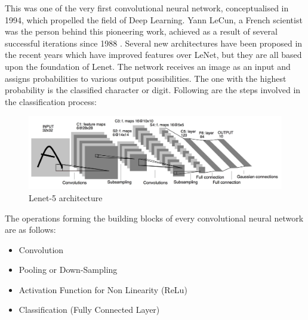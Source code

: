 This was one of the very first convolutional neural network, conceptualised in 1994, which propelled the field of Deep Learning. Yann LeCun, a French scientist was the person behind this pioneering work, achieved as a result of several successful iterations since 1988 \cite{cnn_culurciello}. Several new architectures have been proposed in the recent years which have improved features over LeNet, but they are all based upon the foundation of Lenet. \newline\newline
The network receives an image as an input and assigns probabilities to various output possibilities. The one with the highest probability is the classified character or digit. Following are the steps involved in the classification process:
\begin{figure}[h!]
\centering
\includegraphics[width=\linewidth]{figures/Lenet5.png}
\caption{Lenet-5 architecture}
\label{fig:cnn7}
\end{figure}

The operations forming the building blocks of every convolutional neural network are as follows:
\begin{itemize}
\item Convolution
\item Pooling or Down-Sampling
\item Activation Function for Non Linearity (ReLu)
\item Classification (Fully Connected Layer)
\end{itemize}

